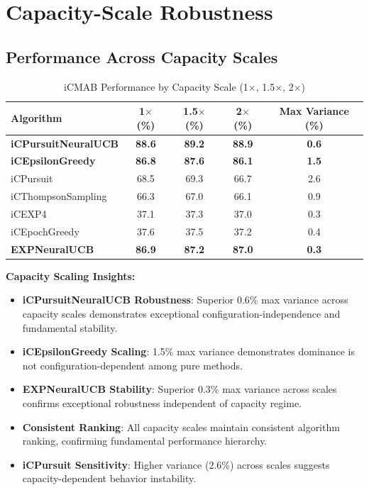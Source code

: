 \documentclass[12pt,a4paper]{article}
\newcommand{\primarytext}[1]{\textcolor{primaryblue}{\textbf{#1}}}
\newcommand{\secondarytext}[1]{\textcolor{secondaryblue}{\textbf{#1}}}
\newcommand{\warning}[1]{\textcolor{warningred}{\textbf{#1}}}
\newcommand{\legacy}[1]{\textcolor{legacycolor}{\textbf{#1}}}
\newcommand{\neural}[1]{\textcolor{neuralcolor}{\textbf{#1}}}
\begin{document}
\section{Capacity-Scale Robustness}

\subsection{Performance Across Capacity Scales}

\begin{table}[H]
\centering
\caption{iCMAB Performance by Capacity Scale (1$\times$, 1.5$\times$, 2$\times$)}
\label{tab:capacity-scale}
\begin{tabular}{@{}lcccc@{}}
\toprule
\textbf{Algorithm} & \textbf{1$\times$ (\%)} & \textbf{1.5$\times$ (\%)} & \textbf{2$\times$ (\%)} & \textbf{Max Variance (\%)} \\
\midrule
\neural{iCPursuitNeuralUCB}   & \neural{88.6} & \neural{89.2} & \neural{88.9} & \neural{0.6} \\
\primarytext{iCEpsilonGreedy}   & \primarytext{86.8} & \primarytext{87.6} & \primarytext{86.1} & \primarytext{1.5} \\
iCPursuit                       & 68.5 & 69.3 & 66.7 & 2.6 \\
iCThompsonSampling              & 66.3 & 67.0 & 66.1 & 0.9 \\
iCEXP4                          & 37.1 & 37.3 & 37.0 & 0.3 \\
iCEpochGreedy                   & 37.6 & 37.5 & 37.2 & 0.4 \\
\legacy{EXPNeuralUCB}           & \legacy{86.9} & \legacy{87.2} & \legacy{87.0} & \legacy{0.3} \\
\bottomrule
\end{tabular}
\end{table}

\textbf{Capacity Scaling Insights:}
\begin{itemize}
\item \neural{iCPursuitNeuralUCB Robustness}: Superior 0.6\% max variance across capacity scales demonstrates exceptional configuration-independence and fundamental stability.
\item \primarytext{iCEpsilonGreedy Scaling}: 1.5\% max variance demonstrates dominance is not configuration-dependent among pure methods.
\item \legacy{EXPNeuralUCB Stability}: Superior 0.3\% max variance across scales confirms exceptional robustness independent of capacity regime.
\item \secondarytext{Consistent Ranking}: All capacity scales maintain consistent algorithm ranking, confirming fundamental performance hierarchy.
\item \warning{iCPursuit Sensitivity}: Higher variance (2.6\%) across scales suggests capacity-dependent behavior instability.
\end{itemize}
\end{document}

